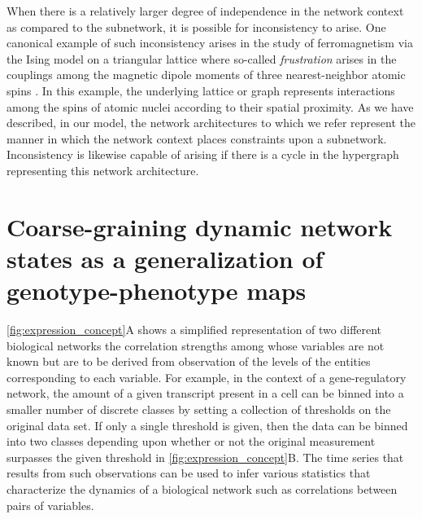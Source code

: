 When there is a relatively larger degree of independence in the network context as compared to the subnetwork, it is possible for inconsistency to arise. One canonical example of such inconsistency arises in the study of ferromagnetism via the Ising model on a triangular lattice where so-called \emph{frustration} arises in the couplings among the magnetic dipole moments of three nearest-neighbor atomic spins \cite{Wannier1950,Toulouse1977,Vannimenus1977}. In this example, the underlying lattice or graph represents interactions among the spins of atomic nuclei according to their spatial proximity. As we have described, in our model, the network architectures to which we refer represent the manner in which the network context places constraints upon a subnetwork. Inconsistency is likewise capable of arising if there is a cycle in the hypergraph representing this network architecture.

\section{Coarse-graining dynamic network states as a generalization of genotype-phenotype maps}\label{sec:genenetworkphenmap}

\ref{fig:expression_concept}A shows a simplified representation of two different biological networks the correlation strengths among whose variables are not known but are to be derived from observation of the levels of the entities corresponding to each variable. For example, in the context of a gene-regulatory network, the amount of a given transcript present in a cell can be binned into a smaller number of discrete classes by setting a collection of thresholds on the original data set. If only a single threshold is given, then the data can be binned into two classes depending upon whether or not the original measurement surpasses the given threshold in \ref{fig:expression_concept}B.
The time series that results from such observations can be used to infer various statistics that characterize the dynamics of a biological network such as correlations between pairs of variables.

